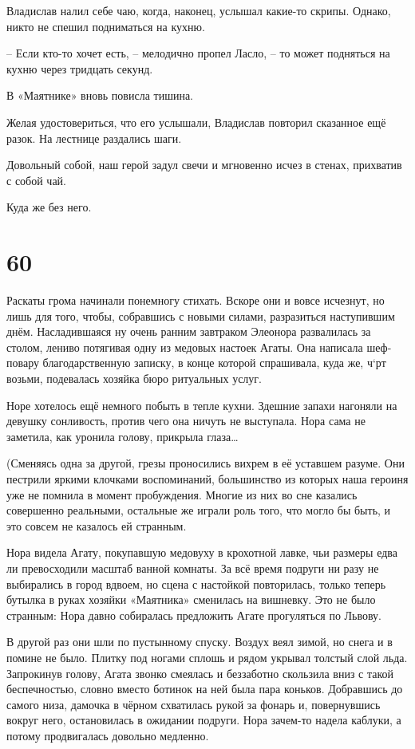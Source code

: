 \documentclass[
  a5paperpaper,
  DIV=11,
  numbers=noendperiod]{scrreprt}
\begin{document}
Владислав налил себе чаю, когда, наконец, услышал какие-то скрипы.
Однако, никто не спешил подниматься на кухню.

-- Если кто-то хочет есть, -- мелодично пропел Ласло, -- то может
подняться на кухню через тридцать секунд.

В «Маятнике» вновь повисла тишина.

Желая удостовериться, что его услышали, Владислав повторил сказанное ещё
разок. На лестнице раздались шаги.

Довольный собой, наш герой задул свечи и мгновенно исчез в стенах,
прихватив с собой чай.

Куда же без него.

\section*{60}\label{60}


Раскаты грома начинали понемногу стихать. Вскоре они и вовсе исчезнут,
но лишь для того, чтобы, собравшись с новыми силами, разразиться
наступившим днём. Насладившаяся ну очень ранним завтраком Элеонора
развалилась за столом, лениво потягивая одну из медовых настоек Агаты.
Она написала шеф-повару благодарственную записку, в конце которой
спрашивала, куда же, ч`рт возьми, подевалась хозяйка бюро ритуальных
услуг.

Норе хотелось ещё немного побыть в тепле кухни. Здешние запахи нагоняли
на девушку сонливость, против чего она ничуть не выступала. Нора сама не
заметила, как уронила голову, прикрыла глаза\ldots{}

(Сменяясь одна за другой, грезы проносились вихрем в её уставшем разуме.
Они пестрили яркими клочками воспоминаний, большинство из которых наша
героиня уже не помнила в момент пробуждения. Многие из них во сне
казались совершенно реальными, остальные же играли роль того, что могло
бы быть, и это совсем не казалось ей странным.

Нора видела Агату, покупавшую медовуху в крохотной лавке, чьи размеры
едва ли превосходили масштаб ванной комнаты. За всё время подруги ни
разу не выбирались в город вдвоем, но сцена с настойкой повторилась,
только теперь бутылка в руках хозяйки «Маятника» сменилась на вишневку.
Это не было странным: Нора давно собиралась предложить Агате прогуляться
по Львову.

В другой раз они шли по пустынному спуску. Воздух веял зимой, но снега и
в помине не было. Плитку под ногами сплошь и рядом укрывал толстый слой
льда. Запрокинув голову, Агата звонко смеялась и беззаботно скользила
вниз с такой беспечностью, словно вместо ботинок на ней была пара
коньков. Добравшись до самого низа, дамочка в чёрном схватилась рукой за
фонарь и, повернувшись вокруг него, остановилась в ожидании подруги.
Нора зачем-то надела каблуки, а потому продвигалась довольно медленно.
\end{document}
